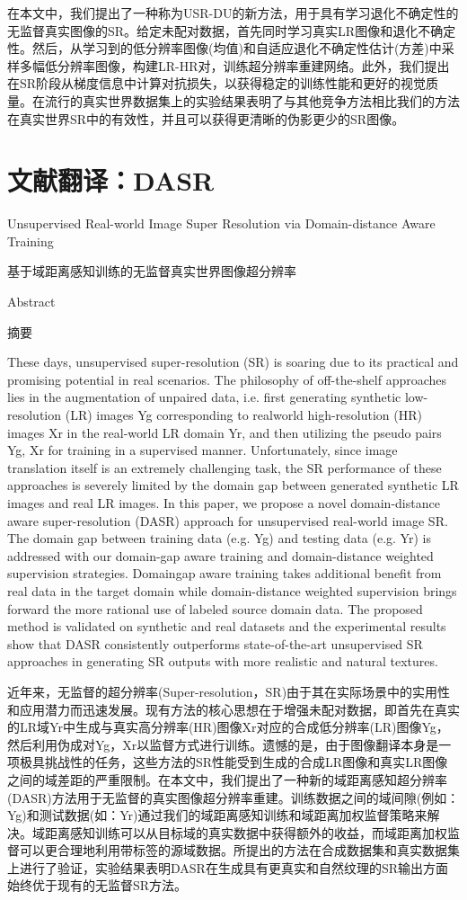 在本文中，我们提出了一种称为USR-DU的新方法，用于具有学习退化不确定性的无监督真实图像的SR。给定未配对数据，首先同时学习真实LR图像和退化不确定性。然后，从学习到的低分辨率图像(均值)和自适应退化不确定性估计(方差)中采样多幅低分辨率图像，构建LR-HR对，训练超分辨率重建网络。此外，我们提出在SR阶段从梯度信息中计算对抗损失，以获得稳定的训练性能和更好的视觉质量。在流行的真实世界数据集上的实验结果表明了与其他竞争方法相比我们的方法在真实世界SR中的有效性，并且可以获得更清晰的伪影更少的SR图像。

\chapter{文献翻译：DASR}

Unsupervised Real-world Image Super Resolution via Domain-distance Aware Training

基于域距离感知训练的无监督真实世界图像超分辨率

Abstract

摘要

These days, unsupervised super-resolution (SR) is soaring due to its practical and promising potential in real scenarios. The philosophy of off-the-shelf approaches lies in the augmentation of unpaired data, i.e. first generating synthetic low-resolution (LR) images Yg corresponding to realworld high-resolution (HR) images Xr in the real-world LR domain Yr, and then utilizing the pseudo pairs {Yg, Xr} for training in a supervised manner. Unfortunately, since image translation itself is an extremely challenging task, the SR performance of these approaches is severely limited by the domain gap between generated synthetic LR images and real LR images. In this paper, we propose a novel domain-distance aware super-resolution (DASR) approach for unsupervised real-world image SR. The domain gap between training data (e.g. Yg) and testing data (e.g. Yr) is addressed with our domain-gap aware training and domain-distance weighted supervision strategies. Domaingap aware training takes additional benefit from real data in the target domain while domain-distance weighted supervision brings forward the more rational use of labeled source domain data. The proposed method is validated on synthetic and real datasets and the experimental results show that DASR consistently outperforms state-of-the-art unsupervised SR approaches in generating SR outputs with more realistic and natural textures.

近年来，无监督的超分辨率(Super-resolution，SR)由于其在实际场景中的实用性和应用潜力而迅速发展。现有方法的核心思想在于增强未配对数据，即首先在真实的LR域Yr中生成与真实高分辨率(HR)图像Xr对应的合成低分辨率(LR)图像Yg，然后利用伪成对{Yg，Xr}以监督方式进行训练。遗憾的是，由于图像翻译本身是一项极具挑战性的任务，这些方法的SR性能受到生成的合成LR图像和真实LR图像之间的域差距的严重限制。在本文中，我们提出了一种新的域距离感知超分辨率(DASR)方法用于无监督的真实图像超分辨率重建。训练数据之间的域间隙(例如：Yg)和测试数据(如：Yr)通过我们的域距离感知训练和域距离加权监督策略来解决。域距离感知训练可以从目标域的真实数据中获得额外的收益，而域距离加权监督可以更合理地利用带标签的源域数据。所提出的方法在合成数据集和真实数据集上进行了验证，实验结果表明DASR在生成具有更真实和自然纹理的SR输出方面始终优于现有的无监督SR方法。

